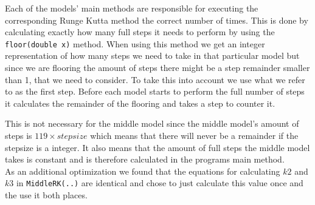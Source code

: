 Each of the models' main methods are responsible for executing the corresponding Runge Kutta method the correct number of times. This is done by calculating exactly how many full steps it needs to perform by using the \texttt{floor(double x)} method. When using this method we get an integer representation of how many steps we need to take in that particular model but since we are flooring the amount of steps there might be a step remainder smaller than 1, that we need to consider. To take this into account we use what we refer to as the first step. Before each model starts to perform the full number of steps it calculates the remainder of the flooring and takes a step to counter it. 

This is not necessary for the middle model since the middle model's amount of steps is $119 \times stepsize$ which means that there will never be a remainder if the stepsize is a integer. It also means that the amount of full steps the middle model takes is constant and is therefore calculated in the programs main method. \\

As an additional optimization we found that the equations for calculating $k2$ and $k3$ in \texttt{MiddleRK(..)} are identical and chose to just calculate this value once and the use it both places. 
